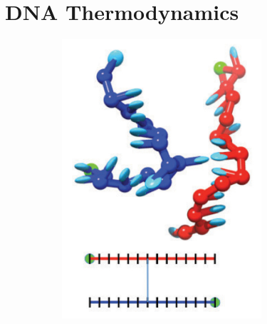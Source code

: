 \section{DNA Thermodynamics}

\begin{figure}[ht]
  \begin{centering}
  \hspace{-0.3cm}
  \begin{subfigure}[t]{\dimexpr.2\linewidth-1.3em\relax}
  \centering
  \includegraphics[width=1.06\linewidth,valign=t]{Figures/hybridDiag1.png}
  \end{subfigure}%
  \hspace{-0.35cm}
  \begin{subfigure}[t]{\dimexpr.2\linewidth-1.3em\relax}

\end{subfigure}
\end{centering}
\end{figure}
